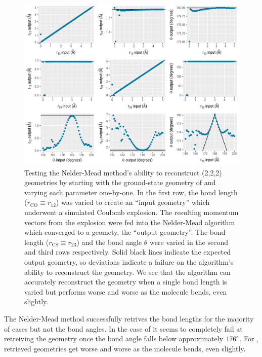 \begin{figure}
  \centering
  \includegraphics[width=\textwidth]{Plots/OCSSimplexCalibrationPlots}
  \caption[Testing the Nelder-Mead method's ability to reconstruct  (2,2,2) geometries.]
  {Testing the Nelder-Mead method's ability to reconstruct  (2,2,2) geometries by starting with the ground-state geometry of  and varying each parameter one-by-one. In the first row, the  bond length ($r_\textrm{CO}\equiv r_{12}$) was varied to create an ``input geometry'' which underwent a simulated Coulomb explosion. The resulting momentum vectors from the explosion were fed into the Nelder-Mead algorithm which converged to a geomety, the ``output geometry''. The  bond length ($r_\textrm{CS}\equiv r_{23}$) and the bond angle $\theta$ were varied in the second and third rows respectively. Solid black lines indicate the expected output geometry, so deviations indicate a failure on the algorithm's ability to reconstruct the geometry. We see that the algorithm can accurately reconstruct the geometry when a single bond length is varied but performs worse and worse as the molecule bends, even slightly.}
  \label{fig:OCSSimplexCalibrationPlots}
\end{figure}

The Nelder-Mead method successfully retrives the bond lengths for the majority of cases but not the bond angles. In the case of  it seems to completely fail at retreiving the geometry once the bond angle falls below approximately $176\degree$. For , retrieved geometries get worse and worse as the molecule bends, even slightly.


